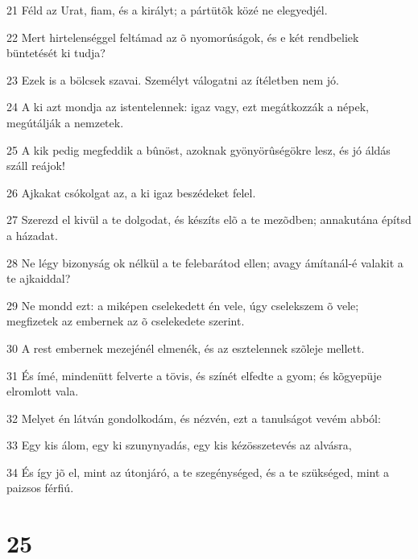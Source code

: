 \par 21 Féld az Urat, fiam, és a királyt; a pártütõk közé ne elegyedjél.
\par 22 Mert hirtelenséggel feltámad az õ nyomorúságok, és e két rendbeliek büntetését ki tudja?
\par 23 Ezek is a bölcsek szavai. Személyt válogatni az ítéletben  nem jó.
\par 24 A ki azt mondja az istentelennek: igaz vagy, ezt megátkozzák a népek, megútálják a nemzetek.
\par 25 A kik pedig megfeddik a bûnöst, azoknak gyönyörûségökre lesz, és jó áldás száll reájok!
\par 26 Ajkakat csókolgat az, a ki igaz beszédeket felel.
\par 27 Szerezd el kivül a te dolgodat, és készíts elõ a te mezõdben; annakutána építsd a házadat.
\par 28 Ne légy bizonyság ok nélkül a te felebarátod ellen; avagy ámítanál-é valakit a te ajkaiddal?
\par 29 Ne mondd ezt: a miképen cselekedett én vele, úgy cselekszem õ vele; megfizetek az embernek az õ cselekedete szerint.
\par 30 A rest embernek mezejénél elmenék, és az esztelennek szõleje mellett.
\par 31 És ímé, mindenütt felverte a tövis, és színét elfedte a gyom; és kõgyepüje elromlott vala.
\par 32 Melyet én látván gondolkodám, és nézvén, ezt a tanulságot vevém abból:
\par 33 Egy kis álom, egy ki szunynyadás, egy kis kézösszetevés az alvásra,
\par 34 És így jõ el, mint az útonjáró, a te szegénységed, és a te szükséged, mint a paizsos férfiú.

\chapter{25}

